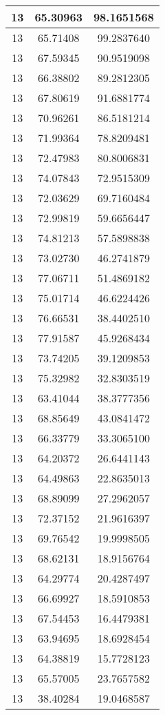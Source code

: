 \documentclass[
]{book}
\begin{document}
\begin{tabular}{c|c|c}
\hline
13 & 65.30963 & 98.1651568\\
\hline
13 & 65.71408 & 99.2837640\\
\hline
13 & 67.59345 & 90.9519098\\
\hline
13 & 66.38802 & 89.2812305\\
\hline
13 & 67.80619 & 91.6881774\\
\hline
13 & 70.96261 & 86.5181214\\
\hline
13 & 71.99364 & 78.8209481\\
\hline
13 & 72.47983 & 80.8006831\\
\hline
13 & 74.07843 & 72.9515309\\
\hline
13 & 72.03629 & 69.7160484\\
\hline
13 & 72.99819 & 59.6656447\\
\hline
13 & 74.81213 & 57.5898838\\
\hline
13 & 73.02730 & 46.2741879\\
\hline
13 & 77.06711 & 51.4869182\\
\hline
13 & 75.01714 & 46.6224426\\
\hline
13 & 76.66531 & 38.4402510\\
\hline
13 & 77.91587 & 45.9268434\\
\hline
13 & 73.74205 & 39.1209853\\
\hline
13 & 75.32982 & 32.8303519\\
\hline
13 & 63.41044 & 38.3777356\\
\hline
13 & 68.85649 & 43.0841472\\
\hline
13 & 66.33779 & 33.3065100\\
\hline
13 & 64.20372 & 26.6441143\\
\hline
13 & 64.49863 & 22.8635013\\
\hline
13 & 68.89099 & 27.2962057\\
\hline
13 & 72.37152 & 21.9616397\\
\hline
13 & 69.76542 & 19.9998505\\
\hline
13 & 68.62131 & 18.9156764\\
\hline
13 & 64.29774 & 20.4287497\\
\hline
13 & 66.69927 & 18.5910853\\
\hline
13 & 67.54453 & 16.4479381\\
\hline
13 & 63.94695 & 18.6928454\\
\hline
13 & 64.38819 & 15.7728123\\
\hline
13 & 65.57005 & 23.7657582\\
\hline
13 & 38.40284 & 19.0468587\\

\end{tabular}
\end{document}
